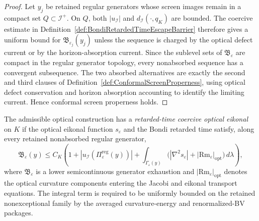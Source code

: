 \begin{proof}
Let $y_j$ be retained regular generators whose screen images remain in a compact set $Q\subset\mathscr I^+$. On $Q$, both $|u_{\mathscr I}|$ and $d_{\mathscr I}(\cdot,q_K)$ are bounded. The coercive estimate in Definition~\ref{def:BondiRetardedTimeEscapeBarrier} therefore gives a uniform bound for $\mathfrak B_{\varepsilon_j}(y_j)$ unless the sequence is charged by the optical defect current or by the horizon-absorption current. Since the sublevel sets of $\mathfrak B_{\varepsilon}$ are compact in the regular generator topology, every nonabsorbed sequence has a convergent subsequence. The two absorbed alternatives are exactly the second and third clauses of Definition~\ref{def:ConformalScreenProperness}, using optical defect conservation and horizon absorption accounting to identify the limiting current. Hence conformal screen properness holds.
\end{proof}

\begin{definition}\label{def:RetardedTimeCoerciveOpticalEikonal}
The admissible optical construction has a \emph{retarded-time coercive optical eikonal} on $K$ if the optical eikonal function $s_\varepsilon$ and the Bondi retarded time satisfy, along every retained nonabsorbed regular generator,
\[
    \mathfrak B_\varepsilon(y)
    \le
    C_K
    \left(
        1
        +
        |u_{\mathscr I}(\Pi_\varepsilon^{\mathrm{reg}}(y))|
        +
        \int_{\Gamma_\varepsilon(y)}
        \bigl(|\nabla^2 s_\varepsilon|+|\mathrm{Rm}_\varepsilon|_{\mathrm{opt}}\bigr)
        \,d\lambda
    \right),
\]
where $\mathfrak B_\varepsilon$ is a lower semicontinuous generator exhaustion and $|\mathrm{Rm}_\varepsilon|_{\mathrm{opt}}$ denotes the optical curvature components entering the Jacobi and eikonal transport equations. The integral term is required to be uniformly bounded on the retained nonexceptional family by the averaged curvature-energy and renormalized-BV packages.
\end{definition}

